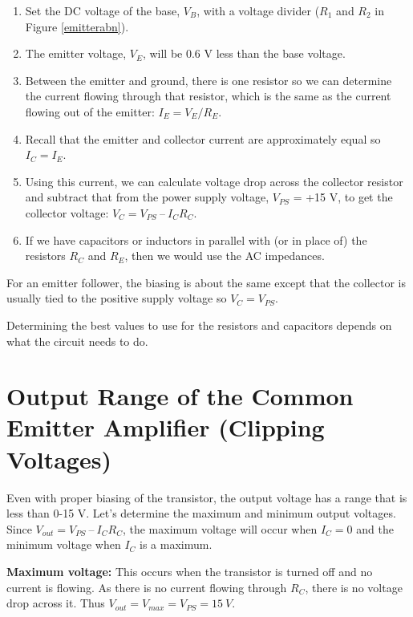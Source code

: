 \documentclass[10pt]{PhysLab1C} %
\begin{document}
\begin{enumerate}

    \item 
     Set the DC voltage of the base, $V_B$, with a voltage divider ($R_1$ and $R_2$ in Figure \ref{emitterabn}).

    \item 
    The emitter voltage, $V_E$, will be 0.6 V less than the base voltage.

    \item 
    Between the emitter and ground, there is one resistor so we can determine the current flowing
through that resistor, which is the same as the current flowing out of the emitter: $I_E = V_E/R_E$.
    \item 
    Recall that the emitter and collector current are approximately equal so $I_C = I_E$.
    \item 
    Using this current, we can calculate voltage drop across the collector resistor and subtract that from
the power supply voltage, $V_{PS}$ = +15 V, to get the collector voltage: $V_C = V_{PS}~ –~ I_CR_C$.
    \item 
    If we have capacitors or inductors in parallel with (or in place of) the resistors $R_C$ and $R_E$, then we would
use the AC impedances.
\end{enumerate}

For an emitter follower, the biasing is about the same except that the collector is usually tied to the positive
supply voltage so $V_C = V_{PS}$.

Determining the best values to use for the resistors and capacitors depends on what the circuit needs to do.


\section{Output Range of the Common Emitter Amplifier (Clipping Voltages)}

Even with proper biasing of the transistor, the output voltage has a range that is less than 0-15 V. Let’s
determine the maximum and minimum output voltages. Since $V_{out} = V_{PS}~ –~ I_CR_C$, the maximum voltage will
occur when $I_C = 0$ and the minimum voltage when $I_C$ is a maximum.

\textbf{Maximum voltage:} This occurs when the transistor is turned off and no current is flowing. As there is no
current flowing through $R_C$, there is no voltage drop across it. Thus $V_{out} = V_{max} = V_{PS} = 15 ~V$.
\end{document}
